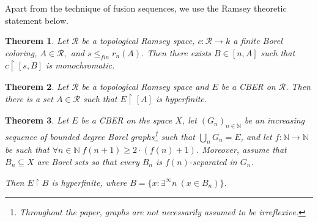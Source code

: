 \documentclass[10pt,a4paper]{amsart}
\newcommand{\N}{\mathbb{N}}
\renewcommand{\restriction}[2]{#1 \upharpoonright #2}
\newtheorem{theorem}{Theorem}[section]
\theoremstyle{definition}
\newcommand{\mc}{\mathcal}
\newcommand{\rstr}{\restriction}
\newcommand{\fR}{\mathcal{R}}
\begin{document}
	Apart from the technique of fusion sequences, we use the Ramsey theoretic statement below.
	
	\begin{theorem}\label{ramsey property}
		Let $\fR$ be a topological Ramsey space, $c:\fR\to k$ a finite Borel coloring, $A\in\fR,$ and $s\le_{fin}r_n(A)$. Then there exists $B\in[n,A]$ such that $\rstr{c}{[s,B]}$ is monochromatic.
	\end{theorem}

	\begin{theorem} \label{t:ramsey hyperfin}
		Let $\mathcal{R}$ be a topological Ramsey space and $E$ be a CBER on $\mathcal{R}$. Then there is a set $A \in \mc{R}$ such that $\restriction{E}{[A]}$ is hyperfinite. 
	\end{theorem}

	\begin{theorem}
		\label{t:separation2}
		Let $E$ be a CBER on the space $X$, let $(G_n)_{n \in \N}$ be an increasing sequence of bounded degree Borel graphs\footnote{Throughout the paper, graphs are not necessarily assumed to be irreflexive.} such that $\bigcup_n G_n=E$, and let $f:\N\to\N$ be such that $\forall n\in\N\; f(n+1)\ge2\cdot(f(n)+1)$. Moreover, assume that $B_n \subseteq X$ are Borel sets so that every $B_n$ is $f(n)$-separated in $G_n$. 
		
		Then $\restriction{E}{B}$ is hyperfinite, where $B=\{x:\exists^\infty n \ (x \in B_n)\}$.
	\end{theorem}
\end{document}
